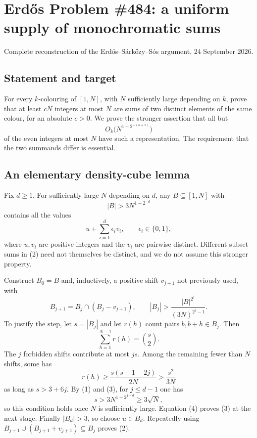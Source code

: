 \section{Erd\H{o}s Problem \#484: a uniform supply of monochromatic sums}
\noindent Complete reconstruction of the Erd\H{o}s--S\'ark\H{o}zy--S\'os argument, 24 September 2026.

\subsection*{Statement and target}
For every $k$-colouring of $[1,N]$, with $N$ sufficiently large depending on $k$, prove that at least $cN$ integers at most $N$ are sums of two distinct elements of the same colour, for an absolute $c>0$. We prove the stronger assertion that all but
\[O_k\bigl(N^{1-2^{-(k+1)}}\bigr)\]
of the even integers at most $N$ have such a representation. The requirement that the two summands differ is essential.

\subsection*{An elementary density-cube lemma}
Fix $d\ge1$. For sufficiently large $N$ depending on $d$, any $B\subseteq[1,N]$ with
\[|B|>3N^{1-2^{-d}}\tag{1}\]
contains all the values
\[u+\sum_{i=1}^d\epsilon_i v_i,\qquad\epsilon_i\in\{0,1\},\tag{2}\]
where $u,v_i$ are positive integers and the $v_i$ are pairwise distinct. Different subset sums in (2) need not themselves be distinct, and we do not assume this stronger property.

Construct $B_0=B$ and, inductively, a positive shift $v_{j+1}$ not previously used, with
\[B_{j+1}=B_j\cap(B_j-v_{j+1}),\qquad
|B_j|>\frac{|B|^{2^j}}{(3N)^{2^j-1}}.\tag{3}\]
To justify the step, let $s=|B_j|$ and let $r(h)$ count pairs $b,b+h\in B_j$. Then
\[\sum_{h=1}^{N-1}r(h)=\binom s2.
\]
The $j$ forbidden shifts contribute at most $js$. Among the remaining fewer than $N$ shifts, some has
\[r(h)\ge\frac{s(s-1-2j)}{2N}>\frac{s^2}{3N}\tag{4}\]
as long as $s>3+6j$. By (1) and (3), for $j\le d-1$ one has
\[s>3N^{1-2^{j-d}}\ge3\sqrt N,
\]
so this condition holds once $N$ is sufficiently large. Equation (4) proves (3) at the next stage. Finally $|B_d|>3$, so choose $u\in B_d$. Repeatedly using $B_{j+1}\cup(B_{j+1}+v_{j+1})\subseteq B_j$ proves (2).

